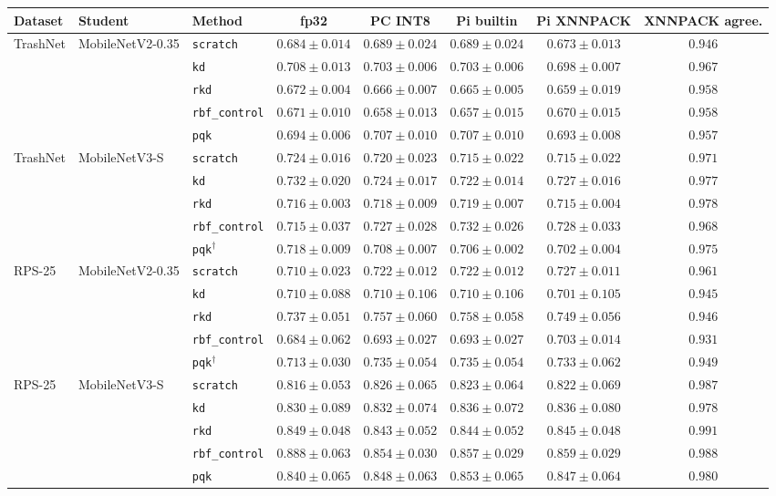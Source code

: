 \begin{tabular}{@{}lllccccc@{}}
\toprule
Dataset & Student & Method & fp32 & PC INT8 & Pi builtin & Pi XNNPACK & XNNPACK agree. \\
\midrule
TrashNet & MobileNetV2-0.35 & \texttt{scratch} & $0.684\pm0.014$ & $0.689\pm0.024$ & $0.689\pm0.024$ & $0.673\pm0.013$ & $0.946$ \\
 &  & \texttt{kd} & $0.708\pm0.013$ & $0.703\pm0.006$ & $0.703\pm0.006$ & $0.698\pm0.007$ & $0.967$ \\
 &  & \texttt{rkd} & $0.672\pm0.004$ & $0.666\pm0.007$ & $0.665\pm0.005$ & $0.659\pm0.019$ & $0.958$ \\
 &  & \texttt{rbf\_control} & $0.671\pm0.010$ & $0.658\pm0.013$ & $0.657\pm0.015$ & $0.670\pm0.015$ & $0.958$ \\
 &  & \texttt{pqk} & $0.694\pm0.006$ & $0.707\pm0.010$ & $0.707\pm0.010$ & $0.693\pm0.008$ & $0.957$ \\
\midrule
TrashNet & MobileNetV3-S & \texttt{scratch} & $0.724\pm0.016$ & $0.720\pm0.023$ & $0.715\pm0.022$ & $0.715\pm0.022$ & $0.971$ \\
 &  & \texttt{kd} & $0.732\pm0.020$ & $0.724\pm0.017$ & $0.722\pm0.014$ & $0.727\pm0.016$ & $0.977$ \\
 &  & \texttt{rkd} & $0.716\pm0.003$ & $0.718\pm0.009$ & $0.719\pm0.007$ & $0.715\pm0.004$ & $0.978$ \\
 &  & \texttt{rbf\_control} & $0.715\pm0.037$ & $0.727\pm0.028$ & $0.732\pm0.026$ & $0.728\pm0.033$ & $0.968$ \\
 &  & \texttt{pqk}$^{\dagger}$ & $0.718\pm0.009$ & $0.708\pm0.007$ & $0.706\pm0.002$ & $0.702\pm0.004$ & $0.975$ \\
\midrule
RPS-25 & MobileNetV2-0.35 & \texttt{scratch} & $0.710\pm0.023$ & $0.722\pm0.012$ & $0.722\pm0.012$ & $0.727\pm0.011$ & $0.961$ \\
 &  & \texttt{kd} & $0.710\pm0.088$ & $0.710\pm0.106$ & $0.710\pm0.106$ & $0.701\pm0.105$ & $0.945$ \\
 &  & \texttt{rkd} & $0.737\pm0.051$ & $0.757\pm0.060$ & $0.758\pm0.058$ & $0.749\pm0.056$ & $0.946$ \\
 &  & \texttt{rbf\_control} & $0.684\pm0.062$ & $0.693\pm0.027$ & $0.693\pm0.027$ & $0.703\pm0.014$ & $0.931$ \\
 &  & \texttt{pqk}$^{\dagger}$ & $0.713\pm0.030$ & $0.735\pm0.054$ & $0.735\pm0.054$ & $0.733\pm0.062$ & $0.949$ \\
\midrule
RPS-25 & MobileNetV3-S & \texttt{scratch} & $0.816\pm0.053$ & $0.826\pm0.065$ & $0.823\pm0.064$ & $0.822\pm0.069$ & $0.987$ \\
 &  & \texttt{kd} & $0.830\pm0.089$ & $0.832\pm0.074$ & $0.836\pm0.072$ & $0.836\pm0.080$ & $0.978$ \\
 &  & \texttt{rkd} & $0.849\pm0.048$ & $0.843\pm0.052$ & $0.844\pm0.052$ & $0.845\pm0.048$ & $0.991$ \\
 &  & \texttt{rbf\_control} & $0.888\pm0.063$ & $0.854\pm0.030$ & $0.857\pm0.029$ & $0.859\pm0.029$ & $0.988$ \\
 &  & \texttt{pqk} & $0.840\pm0.065$ & $0.848\pm0.063$ & $0.853\pm0.065$ & $0.847\pm0.064$ & $0.980$ \\
\bottomrule
\end{tabular}
